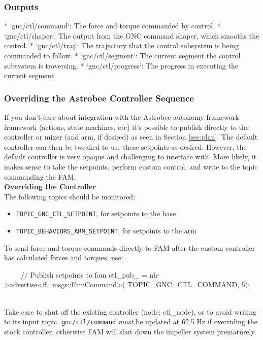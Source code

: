 \documentclass{article}
\begin{document}
\subsubsection{Outputs}
\begin{markdown}
* `gnc/ctl/command`: The force and torque commanded by control.
* `gnc/ctl/shaper`: The output from the GNC command shaper, which smooths the control.
* `gnc/ctl/traj`: The trajectory that the control subsystem is being commanded to follow.
* `gnc/ctl/segment`: The current segment the control subsystem is traversing.
* `gnc/ctl/progress`: The progress in executing the current segment.
\end{markdown}

\subsubsection{Overriding the Astrobee Controller Sequence}

If you don't care about integration with the Astrobee autonomy framework
framework (actions, state machines, etc) it's possible to publish directly to the controller or mixer (and arm, if desired) as seen in Section \ref{sec:plan}. The default controller can then be tweaked to use these setpoints as desired. However, the default controller is very opaque and challenging to interface with. More likely, it makes sense to take the setpoints, perform custom control, and write to the topic commanding the FAM.\\

\noindent\textbf{Overriding the Controller}
\\
\indent The following topics should be monitored:
\\
\begin{itemize}
	\item \texttt{TOPIC\_GNC\_CTL\_SETPOINT}, for setpoints to the base
	\item \texttt{TOPIC\_BEHAVIORS\_ARM\_SETPOINT}, for setpoints to the arm
\end{itemize}

\indent To send force and torque commands directly to FAM after the custom controller has calculated forces and torques, use:
\begin{markdown}
~~~~
//  Publish setpoints to fam
ctl_pub_ = nh->advertise<ff_msgs::FamCommand>(
TOPIC_GNC_CTL_COMMAND, 5);
~~~~
\end{markdown}

Take care to shut off the existing controller (node: ctl\_node), or to avoid writing to its input topic. \texttt{gnc/ctl/command} \textit{must} be updated at 62.5 Hz if overriding the stock controller, otherwise FAM will shut down the impeller system prematurely.
\end{document}
